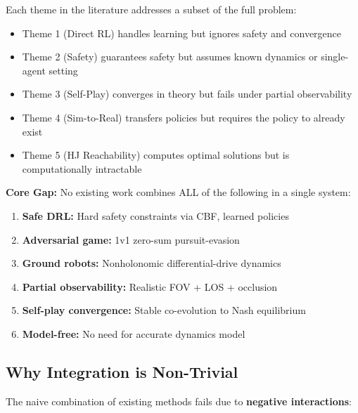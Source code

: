 \documentclass[11pt,a4paper]{report}
\begin{document}
Each theme in the literature addresses a subset of the full problem:
\begin{itemize}
    \item Theme 1 (Direct RL) handles learning but ignores safety and convergence
    \item Theme 2 (Safety) guarantees safety but assumes known dynamics or single-agent setting
    \item Theme 3 (Self-Play) converges in theory but fails under partial observability
    \item Theme 4 (Sim-to-Real) transfers policies but requires the policy to already exist
    \item Theme 5 (HJ Reachability) computes optimal solutions but is computationally intractable
\end{itemize}

\begin{decisionbox}
\textbf{Core Gap:} No existing work combines ALL of the following in a single system:
\begin{enumerate}
    \item \textbf{Safe DRL:} Hard safety constraints via CBF, learned policies
    \item \textbf{Adversarial game:} 1v1 zero-sum pursuit-evasion
    \item \textbf{Ground robots:} Nonholonomic differential-drive dynamics
    \item \textbf{Partial observability:} Realistic FOV + LOS + occlusion
    \item \textbf{Self-play convergence:} Stable co-evolution to Nash equilibrium
    \item \textbf{Model-free:} No need for accurate dynamics model
\end{enumerate}
\end{decisionbox}

\subsection{Why Integration is Non-Trivial}

The naive combination of existing methods fails due to \textbf{negative interactions}:
\end{document}

